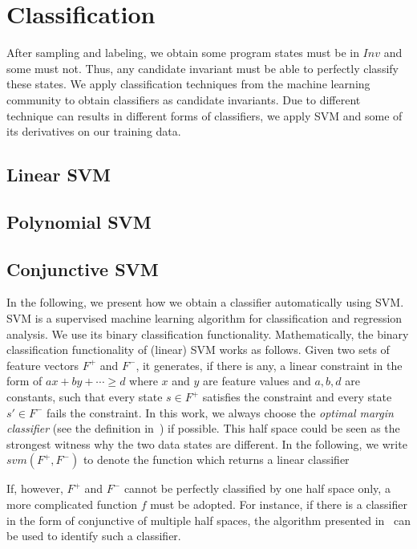 
\section{Classification} %
\label{sec:classification}

After sampling and labeling, we obtain some program states must be in $Inv$ and some must not. 
Thus, any candidate invariant must be able to perfectly classify these states. 
We apply classification techniques from the machine learning community to obtain classifiers as candidate invariants.
Due to different technique can results in different forms of classifiers,
we apply SVM and some of its derivatives on our training data. 

\subsection{Linear SVM}
\subsection{Polynomial SVM}
\subsection{Conjunctive SVM}
In the following, we present how we obtain a classifier automatically using SVM. 
SVM is a supervised machine learning algorithm for classification and regression analysis. 
We use its binary classification functionality. 
Mathematically, the binary classification functionality of (linear) SVM works as follows. 
Given two sets of feature vectors $F^+$ and $F^-$, it generates, if there is any, 
a linear constraint in the form of $ax + by + \cdots \geq d$ where $x$ and $y$ are feature values and $a, b, d$ are constants, 
such that every state $s \in F^+$ satisfies the constraint and every state $s' \in F^-$ fails the constraint. 
In this work, we always choose the \textit{optimal margin classifier} (see the definition in~\cite{Sharma2012}) if possible. 
This half space could be seen as the strongest witness why the two data states are different. 
In the following, we write $svm(F^+, F^-)$ to denote the function which returns a linear classifier

If, however, $F^+$ and $F^-$ cannot be perfectly classified by one half space only, 
a more complicated function $f$ must be adopted. 
For instance, if there is a classifier in the form of conjunctive of multiple half spaces, 
the algorithm presented in~\cite{Sharma2012} can be used to identify such a classifier.

